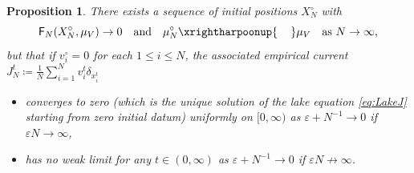 \documentclass[10pt]{amsart}
\theoremstyle{plain}
\newtheorem{prop}[thm]{Proposition}
\theoremstyle{definition}
\let\vep\varepsilon
\newcommand{\XN}{X_N}
\newcommand{\Fr}{\mathsf{F}}
\begin{document}
\begin{prop}\label{prop:1DCou}
There exists a sequence of initial positions $\XN^\circ$ with
\[
\Fr_N(\XN^\circ,\mu_V)\to 0\quad\text{and}\quad\mu_N^\circ \xrightharpoonup{\hphantom{\to\,}} \mu_V\quad\text{as }N\to\infty,
\]
but that if {$v_i^\circ = 0$ for each $1\le i\le N$}, the associated empirical current $J_N^t \coloneqq \frac1N\sum_{i=1}^N v_i^t\delta_{x_i^t}$
\begin{itemize}
\item converges to zero (which is the unique solution of the lake equation \eqref{eq:LakeJ} {starting from zero initial datum}) uniformly on $[0,\infty)$ as $\vep+N^{-1}\to 0$ if $\vep N\to \infty$,
\item has no weak limit for any $t\in (0,\infty)$ as $\vep+N^{-1}\to 0$ if $\vep N \not\to \infty$.
\end{itemize}
\end{prop}
\end{document}
